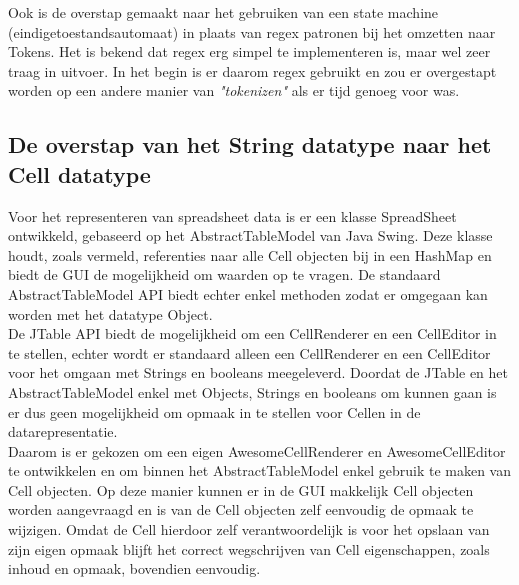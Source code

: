 \documentclass[a4paper,11pt]{article}
\begin{document}
Ook is de overstap gemaakt naar het gebruiken van een state machine (eindigetoestandsautomaat) in plaats van regex patronen bij het omzetten naar Tokens. Het is bekend dat regex erg simpel te implementeren is, maar wel zeer traag in uitvoer. In het begin is er daarom regex gebruikt en zou er overgestapt worden op een andere manier van \textit{"tokenizen"} als er tijd genoeg voor was.

\subsection{De overstap van het String datatype naar het Cell datatype}
Voor het representeren van spreadsheet data is er een klasse SpreadSheet ontwikkeld, gebaseerd op het AbstractTableModel van Java Swing. Deze klasse houdt, zoals vermeld, referenties naar alle Cell objecten bij in een HashMap en biedt de GUI de mogelijkheid om waarden op te vragen. De standaard AbstractTableModel API biedt echter enkel methoden zodat er omgegaan kan worden met het datatype Object.\\

De JTable API biedt de mogelijkheid om een CellRenderer en een CellEditor in te stellen, echter wordt er standaard alleen een CellRenderer en een CellEditor voor het omgaan met Strings en booleans meegeleverd. Doordat de JTable en het AbstractTableModel enkel met Objects, Strings en booleans om kunnen gaan is er dus geen mogelijkheid om opmaak in te stellen voor Cellen in de datarepresentatie.\\

Daarom is er gekozen om een eigen AwesomeCellRenderer en AwesomeCellEditor te ontwikkelen en om binnen het AbstractTableModel enkel gebruik te maken van Cell objecten. Op deze manier kunnen er in de GUI makkelijk Cell objecten worden aangevraagd en is van de Cell objecten zelf eenvoudig de opmaak te wijzigen. Omdat de Cell hierdoor zelf verantwoordelijk is voor het opslaan van zijn eigen opmaak blijft het correct wegschrijven van Cell eigenschappen, zoals inhoud en opmaak, bovendien eenvoudig.
\end{document}
